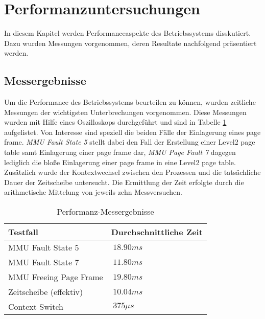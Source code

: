 \section{Performanzuntersuchungen}
\label{Performanz}

In diesem Kapitel werden Performanceaspekte des Betriebssystems disskutiert. Dazu wurden Messungen vorgenommen, deren Resultate nachfolgend präsentiert werden.

\subsection{Messergebnisse}
Um die Performance des Betriebssystems beurteilen zu können, wurden zeitliche Messungen der wichtigsten Unterbrechungen vorgenommen. Diese Messungen wurden mit Hilfe eines Oszilloskops durchgeführt und sind in Tabelle \ref{table:osciResults} aufgelistet. Von Interesse sind speziell die beiden Fälle der Einlagerung eines page frame. \emph{MMU Fault State 5} stellt dabei den Fall der Erstellung einer Level2 page table samt Einlagerung einer page frame dar, \emph{MMU Page Fault 7} dagegen lediglich die bloße Einlagerung einer page frame in eine Level2 page table. Zusätzlich wurde der Kontextwechsel zwischen den Prozessen und die tatsächliche Dauer der Zeitscheibe untersucht. Die Ermittlung der Zeit erfolgte durch die arithmetische Mittelung von jeweils zehn Messversuchen.\\

\begin{table}[H]
\begin{tabular}{p{7cm} | p{7cm}}
  \textbf{Testfall} & \textbf{Durchschnittliche Zeit} \\ \hline
  	MMU Fault State 5 & $~18.90 ms$ \\
  	MMU Fault State 7 & $~11.80 ms$ \\
  	MMU Freeing Page Frame & $~19.80 ms$ \\
  	Zeitscheibe (effektiv) & $~10.04 ms$ \\
  	Context Switch & $~375 \mu s$ \\
 \end{tabular}
 \caption{Performanz-Messergebnisse}
 \label{table:osciResults}
\end{table}

\pagebreak 